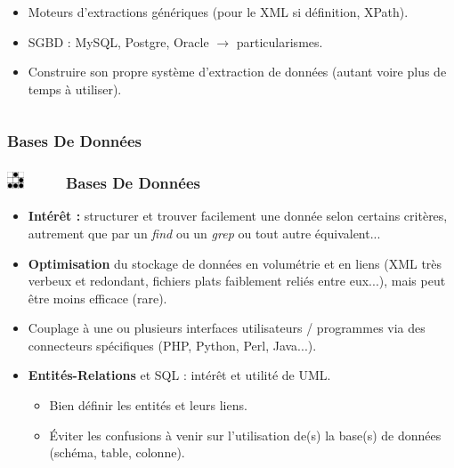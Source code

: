 \documentclass[slidetop,11pt]{beamer}
\def\sectionPartIbDE{Bases De Donn{\'e}es}
\def\moreInFrameTitle{\includegraphics[height=0.5cm]{img/logo_glider.png}~~~~~}
\begin{document}
\begin{frame}
\begin{columns}[t]
\begin{column}[c]{6cm}
\begin{beamerboxesrounded}	[lower=substructureTR, %
		 				 upper=block title TR,%
						 shadow=true]
\begin{itemize}
				\item Moteurs d'extractions g{\'e}n{\'e}riques (pour le XML si d{\'e}finition, XPath). 
				\item SGBD : MySQL, Postgre, Oracle $\rightarrow$ particularismes. 
				\item Construire son propre syst{\`e}me d'extraction de donn{\'e}es (autant voire plus de temps {\`a} utiliser). 
			\end{itemize}
		 \end{beamerboxesrounded}
	\end{column}
	\end{columns}
\end{frame} 

\subsubsection{\sectionPartIbDE}
\begin{frame}
	\frametitle{\moreInFrameTitle \sectionPartIbDE}
	\begin{itemize}		 
		\item \textbf{Int{\'e}r{\^e}t : } structurer et trouver facilement une donn{\'e}e selon certains crit{\`e}res, autrement que par un \emph{find} ou un \emph{grep} ou tout autre {\'e}quivalent...~\\
		\item \textbf{Optimisation} du stockage de donn{\'e}es en volum{\'e}trie et en liens (XML tr{\`e}s verbeux et redondant, fichiers plats faiblement reli{\'e}s entre eux...), mais peut {\^e}tre moins efficace (rare). 
		\item Couplage {\`a} une ou plusieurs interfaces utilisateurs / programmes via des connecteurs sp{\'e}cifiques (PHP, Python, Perl, Java...). 
		\item \textbf{Entit{\'e}s-Relations} et SQL : int{\'e}r{\^e}t et utilit{\'e} de UML. 
		\begin{itemize}
			\item Bien d{\'e}finir les entit{\'e}s et leurs liens. 
			\item {\'E}viter les confusions {\`a} venir sur l'utilisation de(s) la base(s) de donn{\'e}es (sch{\'e}ma, table, colonne). 
		\end{itemize}
	\end{itemize}
\end{frame} 
\end{document}
